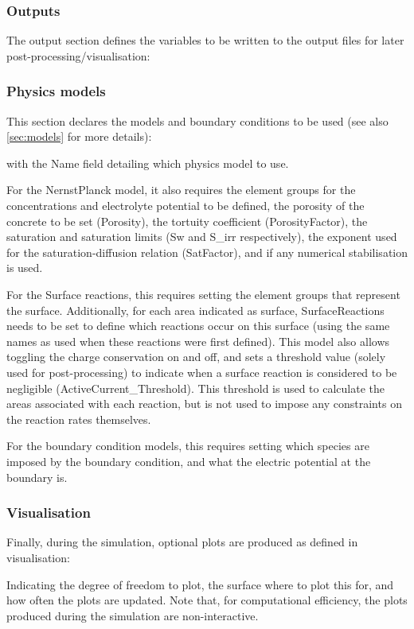 \documentclass[3p]{elsarticle} %
\newcommand{\CodeSnipU}[4]{}
\begin{document}
\subsubsection{Outputs}
The output section defines the variables to be written to the output files for later post-processing/visualisation:
\CodeSnipU{TestCases/ElectroChemistry/Test_ElectroChem.json}{174}{190}{TestCases/ElectroChemistry/Test\_ElectroChem.json}

\subsubsection{Physics models}
This section declares the models and boundary conditions to be used (see also \cref{sec:models} for more details):
\CodeSnipU{TestCases/ElectroChemistry/Test_ElectroChem.json}{191}{229}{TestCases/ElectroChemistry/Test\_ElectroChem.json}
with the Name field detailing which physics model to use. 

For the NernstPlanck model, it also requires the element groups for the concentrations and electrolyte potential to be defined, the porosity of the concrete to be set (Porosity), the tortuity coefficient (PorosityFactor), the saturation and saturation limits (Sw and S\_irr respectively), the exponent used for the saturation-diffusion relation (SatFactor), and if any numerical stabilisation is used. 

For the Surface reactions, this requires setting the element groups that represent the surface. Additionally, for each area indicated as surface, SurfaceReactions needs to be set to define which reactions occur on this surface (using the same names as used when these reactions were first defined). This model also allows toggling the charge conservation on and off, and sets a threshold value (solely used for post-processing) to indicate when a surface reaction is considered to be negligible (ActiveCurrent\_Threshold). This threshold is used to calculate the areas associated with each reaction, but is not used to impose any constraints on the reaction rates themselves.

For the boundary condition models, this requires setting which species are imposed by the boundary condition, and what the electric potential at the boundary is.

\subsubsection{Visualisation}
Finally, during the simulation, optional plots are produced as defined in visualisation: 
\CodeSnipU{TestCases/ElectroChemistry/Test_ElectroChem.json}{230}{237}{TestCases/ElectroChemistry/Test\_ElectroChem.json}
Indicating the degree of freedom to plot, the surface where to plot this for, and how often the plots are updated. Note that, for computational efficiency, the plots produced during the simulation are non-interactive. 
\end{document}

